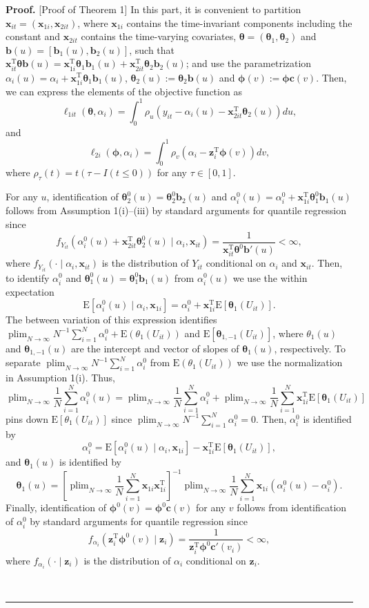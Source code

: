 \documentclass[12pt]{article}
\def\T{{ \mathrm{\scriptscriptstyle T} }}
\def\thetavec{\bm{\theta}}
\def\phivec{\bm{\phi}}
\def\xx{\bm{x}}
\def\zz{\bm{z}}
\def\bvec{\bm{b}}
\def\cvec{\bm{c}}
\def\Ep{\mathrm{E}}
\DeclareMathOperator{\plim}{plim}
\newenvironment{proof}[1][Proof]{\textbf{#1.} }{\ \rule{0.5em}{0.5em}}
\begin{document}
\begin{proof} [Proof of Theorem 1]
In this part, it is convenient to partition $\xx_{it} = (\xx_{1i},\xx_{2it})$, where $\xx_{1i}$ contains the time-invariant components including the constant and $\xx_{2it}$ contains the time-varying covariates,  $\thetavec = (\thetavec_1,\thetavec_2)$ and $\bvec(u) = [\bvec_1(u), \bvec_2(u)]$,  such that $\xx_{it}^{\T} \thetavec \bvec(u) = \xx_{1i}^{\T} \thetavec_1 \bvec_1(u) + \xx_{2it}^{\T} \thetavec_2 \bvec_2(u)$; and  use the parametrization $\alpha_i(u) = \alpha_i + \xx_{1i}^{\T}\thetavec_1 \bvec_1(u)$, $\thetavec_2(u) := \thetavec_2 \bvec(u)$ and $\phivec(v) := \phivec \cvec(v)$. Then, we can express the elements of the objective function as
$$
\ell_{1it}(\thetavec,\alpha_i) = \int_0^1 \rho_u(y_{it} - \alpha_i(u) - \xx_{2it}^{\T} \thetavec_2(u)) du,
$$
and
$$
\ell_{2i}(\phivec,\alpha_i) = \int_0^1  \rho_v(\alpha_i - \zz_i^{\T} \phivec(v)) dv,
$$
where $\rho_{\tau}(t) = t(\tau - I(t \leq 0))$ for any $\tau \in [0,1]$. 

For any $u$, identification of $\thetavec_2^0(u) = \thetavec_2^0 \bvec_2(u)$ and $\alpha_i^0(u) = \alpha_i^0 + \xx_{1i}^{\T}\thetavec_1^0 \bvec_1(u)$ follows from Assumption 1(i)--(iii) by standard arguments for quantile regression since %
$$
f_{Y_{it}}(\alpha_i^0(u) + \xx_{2it}^{\T} \thetavec_2^0(u) \mid \alpha_i, \xx_{it}) = \frac{1}{\xx_{it}^{\T}\thetavec^0 \bvec'(u)} < \infty,
$$
where $f_{Y_{it}}(\cdot \mid \alpha_i, \xx_{it}) $ is the distribution of $Y_{it}$ conditional on $\alpha_i$ and $\xx_{it}$.
Then, to identify $\alpha_i^0$ and $\thetavec_1^0(u) = \thetavec_1^0 \bvec_1(u)$ from $\alpha_i^0(u)$ we use the within expectation
$$
\Ep[\alpha_i^0(u) \mid \alpha_i, \xx_{1i}] = \alpha_i^0 + \xx_{1i}^{\T} \Ep[\thetavec_1(U_{it})].
$$  
The between variation of this expression identifies $\plim_{N \to \infty} N^{-1} \sum_{i=1}^N \alpha_i^0 + \Ep(\theta_{1}(U_{it}))$ and  $\Ep[\thetavec_{1,-1}(U_{it})]$, where $\theta_1(u)$  and $\thetavec_{1,-1}(u)$ are the intercept and vector of slopes of $\thetavec_1(u)$, respectively.  To separate $\plim_{N \to \infty} N^{-1} \sum_{i=1}^N \alpha_i^0$ from  $\Ep(\theta_{1}(U_{it}))$ we use the normalization in Assumption 1(i). Thus, %
$$
\plim_{N\to \infty} \frac{1}{N} \sum_{i=1}^N \alpha_i^0(u) = \plim_{N\to \infty}\frac{1}{N}  \sum_{i=1}^N \alpha_i^0 + \plim_{N\to \infty}\frac{1}{N}  \sum_{i=1}^N \xx_{1i}^{\T} \Ep[\thetavec_1(U_{it})] 
$$
pins down $\Ep[\theta_1(U_{it})]$ since $\plim_{N\to \infty}N^{-1} \sum_{i=1}^N \alpha_i^0 = 0$. Then, $\alpha_i^0$ is identified by
$$
\alpha_i^0 = \Ep[\alpha_i^0(u) \mid \alpha_i, \xx_{1i}] - \xx_{1i}^{\T} \Ep[\thetavec_1(U_{it})],
$$
and $\thetavec_{1}(u)$ is identified by
$$
\thetavec_{1}(u) = \left[ \plim_{N\to \infty}\frac{1}{N}  \sum_{i=1}^N  \xx_{1i} \xx_{1i}^{\T} \right]^{-1} \plim_{N\to \infty}\frac{1}{N}  \sum_{i=1}^N \xx_{1i} (\alpha_i^0(u) - \alpha_i^0).
$$
Finally, identification of $\phivec^0(v) = \phivec^0 \cvec(v)$ for any $v$ follows from identification of $\alpha_i^0$ by standard arguments for quantile regression since
$$
f_{\alpha_i}(\zz_{i}^{\T} \phivec^0(v) \mid \zz_{i}) = \frac{1}{\zz_{i}^{\T}\phivec^0 \cvec'(v_{i})} < \infty,
$$
where $f_{\alpha_i}(\cdot \mid \zz_{i})$ is the distribution of $\alpha_i$ conditional on $\zz_{i}$.


\end{proof}
\end{document}
